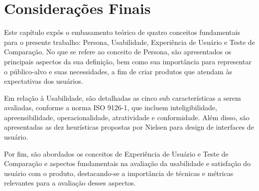 \section{Considerações Finais}
\label{sec:Considerações Finais}

Este capítulo expôs o embasamento teórico de quatro conceitos fundamentais para o presente trabalho: Persona, Usabilidade, Experiência de Usuário e Teste de Comparação. No que se 
refere ao conceito de Persona, são apresentados os principais aspectos da sua definição, bem como sua importância para representar o público-alvo e suas necessidades, a fim de criar 
produtos que atendam às expectativas dos usuários. 

Em relação à Usabilidade, são detalhadas as cinco sub características a serem avaliadas, conforme a norma ISO 9126-1, que incluem inteligibilidade, apreensibilidade, operacionalidade, 
atratividade e conformidade. Além disso, são apresentadas as dez heurísticas propostas por Nielsen para design de interfaces de usuário. 

Por fim, são abordados os conceitos de Experiência de Usuário e Teste de Comparação e aspectos fundamentais na avaliação da usabilidade e satisfação do usuário com o produto, 
destacando-se a importância de técnicas e métricas relevantes para a avaliação desses aspectos.
